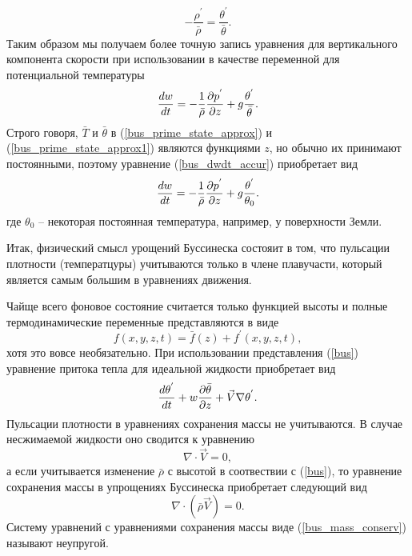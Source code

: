     \begin{equation}
    \label{bus_prime_state_approx1}
        -\frac{\rho^{'}}{\bar{\rho}} = \frac{\theta^{'}}{\bar{\theta}}.
    \end{equation}
    Таким образом мы получаем более точную запись уравнения для вертикального компонента скорости при использовании в качестве переменной для потенциальной температуры
    \begin{equation}
    \label{bus_dwdt_accur}
        \displaystyle\frac{d w}{d t}=-\frac{1}{\bar{\rho}}\displaystyle\frac{\partial p^{'}}{\partial z}+g\frac{\theta^{'}}{\bar{\theta}}.
    \end{equation}
    Строго говоря, $\bar{T}$ и $\bar{\theta}$ в (\ref{bus_prime_state_approx}) и (\ref{bus_prime_state_approx1}) являются функциями $z$, но обычно их принимают постоянными, поэтому уравнение (\ref{bus_dwdt_accur}) приобретает вид
    \begin{equation}
    \label{bus_dwdt_accur1}
        \displaystyle\frac{d w}{d t}=-\frac{1}{\bar{\rho}}\displaystyle\frac{\partial p^{'}}{\partial z}+g\frac{\theta^{'}}{\theta_0}.
    \end{equation}
    где $\theta_0$ -- некоторая постоянная температура, например, у поверхности Земли. 

    Итак, физический смысл урощений Буссинеска состояит в том, что пульсации плотности (температцуры) учитываются только в члене плавучасти, который является самым большим в уравнениях движения.

    Чайще всего фоновое состояние считается только функцией высоты и полные термодинамические переменные представляются в виде 
    \begin{equation}
    \label{bus}
        f(x,y,z,t) = \bar{f}(z) + f^{'}(x,y,z,t), 
    \end{equation}
    хотя это вовсе необязательно. При использовании представления (\ref{bus}) уравнение притока тепла для идеальной жидкости приобретает вид
    \begin{equation}
        \displaystyle\frac{d \theta^{'}}{d t} + w\displaystyle\frac{\partial \bar{\theta}}{\partial z} + \vec{V}\nabla\theta^{'}.
    \end{equation}
    Пульсации плотности в уравнениях сохранения массы не учитываются. В случае несжимаемой жидкости оно сводится к уравнению
    \[
    \nabla\cdot\vec{V}=0,
    \]
    а если учитывается изменение $\bar{\rho}$ с высотой в соотвествии с (\ref{bus}), то уравнение сохранения массы в упрощениях Буссинеска приобретает следующий вид
    \begin{equation}
    \label{bus_mass_conserv}
        \nabla\cdot(\bar{\rho}\vec{V})=0.
    \end{equation}
    Систему уравнений с уравнениями сохранения массы виде (\ref{bus_mass_conserv}) называют неупругой. 

